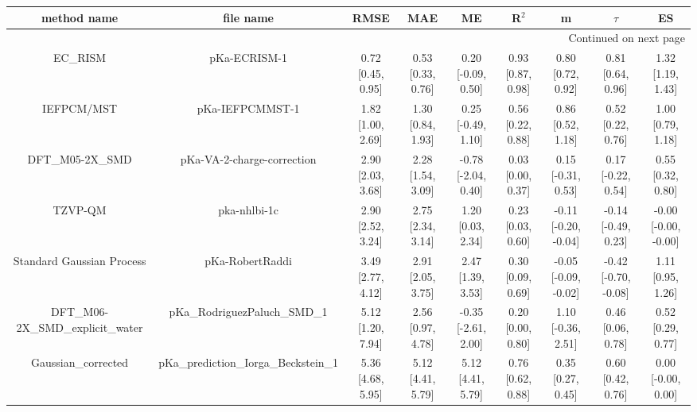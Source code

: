 \documentclass{article}
\begin{document}
\begin{center}
\scriptsize
\begin{longtable}{|ccccccccc|}
\toprule
                   method name &                             file name &               RMSE &                MAE &                   ME &              R$^2$ &                     m &                $\tau$ &                    ES \\
\midrule
\endhead
\midrule
\multicolumn{9}{r}{{Continued on next page}} \\
\midrule
\endfoot

\bottomrule
\endlastfoot
                       EC_RISM &                          pKa-ECRISM-1 &  0.72 [0.45, 0.95] &  0.53 [0.33, 0.76] &   0.20 [-0.09, 0.50] &  0.93 [0.87, 0.98] &     0.80 [0.72, 0.92] &     0.81 [0.64, 0.96] &     1.32 [1.19, 1.43] \\
                    IEFPCM/MST &                       pKa-IEFPCMMST-1 &  1.82 [1.00, 2.69] &  1.30 [0.84, 1.93] &   0.25 [-0.49, 1.10] &  0.56 [0.22, 0.88] &     0.86 [0.52, 1.18] &     0.52 [0.22, 0.76] &     1.00 [0.79, 1.18] \\
                DFT_M05-2X_SMD &            pKa-VA-2-charge-correction &  2.90 [2.03, 3.68] &  2.28 [1.54, 3.09] &  -0.78 [-2.04, 0.40] &  0.03 [0.00, 0.37] &    0.15 [-0.31, 0.53] &    0.17 [-0.22, 0.54] &     0.55 [0.32, 0.80] \\
                       TZVP-QM &                          pka-nhlbi-1c &  2.90 [2.52, 3.24] &  2.75 [2.34, 3.14] &    1.20 [0.03, 2.34] &  0.23 [0.03, 0.60] &  -0.11 [-0.20, -0.04] &   -0.14 [-0.49, 0.23] &  -0.00 [-0.00, -0.00] \\
     Standard Gaussian Process &                       pKa-RobertRaddi &  3.49 [2.77, 4.12] &  2.91 [2.05, 3.75] &    2.47 [1.39, 3.53] &  0.30 [0.09, 0.69] &  -0.05 [-0.09, -0.02] &  -0.42 [-0.70, -0.08] &     1.11 [0.95, 1.26] \\
 DFT_M06-2X_SMD_explicit_water &          pKa\_RodriguezPaluch\_SMD\_1 &  5.12 [1.20, 7.94] &  2.56 [0.97, 4.78] &  -0.35 [-2.61, 2.00] &  0.20 [0.00, 0.80] &    1.10 [-0.36, 2.51] &     0.46 [0.06, 0.78] &     0.52 [0.29, 0.77] \\
            Gaussian_corrected &  pKa\_prediction\_Iorga\_Beckstein\_1 &  5.36 [4.68, 5.95] &  5.12 [4.41, 5.79] &    5.12 [4.41, 5.79] &  0.76 [0.62, 0.88] &     0.35 [0.27, 0.45] &     0.60 [0.42, 0.76] &    0.00 [-0.00, 0.00] \\
\end{longtable}
\end{center}
\end{document}
